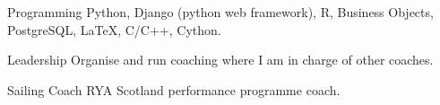 

\begin{cvskills}

  \cvskill
    {Programming} %
    {Python, Django (python web framework), R, Business Objects, PostgreSQL, LaTeX, C/C++, Cython.} %

  \cvskill
    {Leadership} %
    {Organise and run coaching where I am in charge of other coaches.} %

  \cvskill
    {Sailing Coach} %
    {RYA Scotland performance programme coach.}


\end{cvskills}
